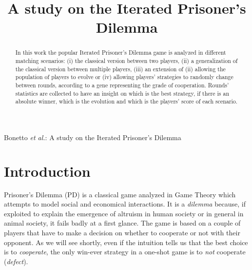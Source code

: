 \documentclass[journal,10pt,twoside]{IEEEtran}
\begin{document}
\title{A study on the Iterated Prisoner's Dilemma}

\author{%

}
%
	{Bonetto \MakeLowercase{\textit{et al.}}: A study on the Iterated Prisoner's Dilemma}

\maketitle

\begin{abstract}
In this work the popular Iterated Prisoner's Dilemma game is analyzed in different matching scenarios: (i) the classical version between two players, (ii) a generalization of the classical version between multiple players, (iii) an extension of (ii) allowing the population of players to evolve or (iv) allowing players' strategies to randomly change between rounds, according to a gene representing the grade of cooperation. %
Rounds' statistics are collected to have an insight on which is the best strategy, if there is an absolute winner, which is the evolution and which is the players' score of each scenario.
\end{abstract}

\section{Introduction} \label{s:intro}
 Prisoner's Dilemma (PD) is a classical game analyzed in Game Theory which attempts to model social and economical interactions. It is a \textit{dilemma} because, if exploited to explain the emergence of altruism in human society or in general in animal society, it fails badly at a first glance. The game is based on a couple of players that have to make a decision on whether to cooperate or not with their opponent. As we will see shortly, even if the intuition tells us that the best choice is to \textit{cooperate}, the only win-ever strategy in a one-shot game is to \textit{not} cooperate (\textit{defect}).
\end{document}
